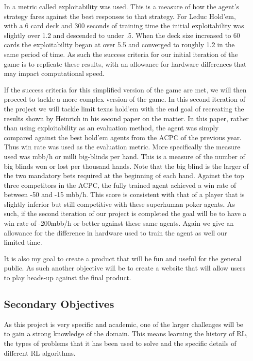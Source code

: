 In\citep{heinrich2015fictitious} a metric called exploitability was used.
This is a measure of how the agent's strategy fares against the best responses to that strategy.
For Leduc Hold'em, with a 6 card deck and 300 seconds of training time the initial exploitability was slightly
over 1.2 and descended to under .5.
When the deck size increased to 60 cards the exploitability began at over 5.5 and converged to roughly 1.2 in
the same period of time.
As such the success criteria for our initial iteration of the game is to replicate these results, with an
allowance for hardware differences that may impact computational speed.

If the success criteria for this simplified version of the game are met, we will then proceed to tackle
a more complex version of the game.
In this second iteration of the project we will tackle limit texas hold'em with the end goal of recreating
the results shown by Heinrich in his second paper on the matter\citep{heinrich2016deep}.
In this paper, rather than using exploitability as an evaluation method, the agent was simply compared
against the best hold'em agents from the ACPC of the previous year.
Thus win rate was used as the evaluation metric.
More specifically the measure used was mbb/h or milli big-blinds per hand.
This is a measure of the number of big blinds won or lost per thousand hands.
Note that the big blind is the larger of the two mandatory bets required at the beginning of each hand.
Against the top three competitors in the ACPC, the fully trained agent achieved a win rate of between
-50 and -15 mbb/h.
This score is consistent with that of a player that is slightly inferior but still competitive with
these superhuman poker agents.
As such, if the second iteration of our project is completed the goal will be to have a win rate of -200mbb/h
or better against these same agents.
Again we give an allowance for the difference in hardware used to train the agent as well our limited time.

It is also my goal to create a product that will be fun and useful for the general public.
As such another objective will be to create a website that will allow users to play heads-up against the final product.

\subsection{Secondary Objectives}\label{subsec:secondaryObjectives}
As this project is very specific and academic, one of the larger challenges will be to gain a strong knowledge
of the domain.
This means learning the history of RL, the types of problems that it has been used to solve and the specific details of
different RL algorithms.

